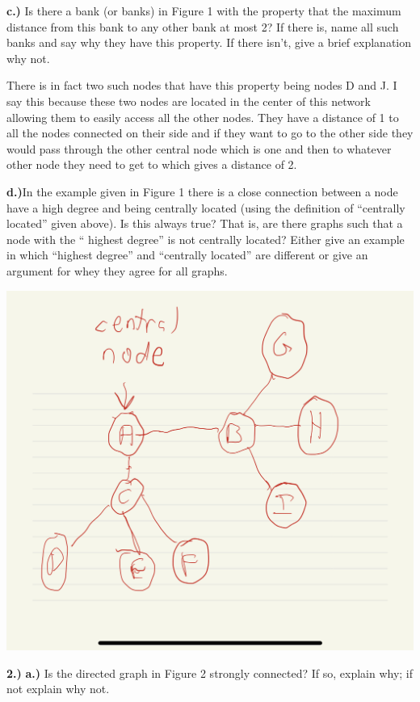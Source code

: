 \documentclass[
]{article}
\begin{document}
\textbf{c.)} Is there a bank (or banks) in Figure 1 with the property
that the maximum distance from this bank to any other bank at most 2? If
there is, name all such banks and say why they have this property. If
there isn't, give a brief explanation why not.

There is in fact two such nodes that have this property being nodes D
and J. I say this because these two nodes are located in the center of
this network allowing them to easily access all the other nodes. They
have a distance of 1 to all the nodes connected on their side and if
they want to go to the other side they would pass through the other
central node which is one and then to whatever other node they need to
get to which gives a distance of 2.

\textbf{d.)}In the example given in Figure 1 there is a close connection
between a node have a high degree and being centrally located (using the
definition of ``centrally located'' given above). Is this always true?
That is, are there graphs such that a node with the `` highest degree''
is not centrally located? Either give an example in which ``highest
degree'' and ``centrally located'' are different or give an argument for
whey they agree for all graphs.

\includegraphics{graph1.jpg}

\textbf{2.)} \textbf{a.)} Is the directed graph in Figure 2 strongly
connected? If so, explain why; if not explain why not.
\end{document}
